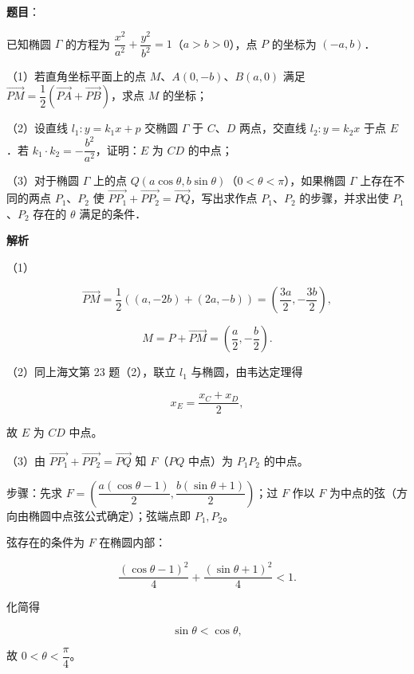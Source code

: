 \begin{answer}

\textbf{题目}：

已知椭圆 $\Gamma$ 的方程为 $\dfrac{x^2}{a^2}+\dfrac{y^2}{b^2}=1$（$a>b>0$），点 $P$ 的坐标为 $(-a,b)$．

（1）若直角坐标平面上的点 $M$、$A(0,-b)$、$B(a,0)$ 满足 $\overrightarrow{PM}=\dfrac12\left(\overrightarrow{PA}+\overrightarrow{PB}\right)$，求点 $M$ 的坐标；

（2）设直线 $l_1:y=k_1x+p$ 交椭圆 $\Gamma$ 于 $C$、$D$ 两点，交直线 $l_2:y=k_2x$ 于点 $E$．若 $k_1\cdot k_2=-\dfrac{b^2}{a^2}$，证明：$E$ 为 $CD$ 的中点；

（3）对于椭圆 $\Gamma$ 上的点 $Q(a\cos\theta,b\sin\theta)$（$0<\theta<\pi$），如果椭圆 $\Gamma$ 上存在不同的两点 $P_1$、$P_2$ 使 $\overrightarrow{PP_1}+\overrightarrow{PP_2}=\overrightarrow{PQ}$，写出求作点 $P_1$、$P_2$ 的步骤，并求出使 $P_1$、$P_2$ 存在的 $\theta$ 满足的条件．
\nopagebreak[4]
\begin{center}\end{center}
\nopagebreak[4]
\textbf{解析}

（1）

\nopagebreak[4]
\[\overrightarrow{PM}=\frac12\left((a,-2b)+(2a,-b)\right)
=\left(\frac{3a}2,-\frac{3b}2\right),\]

\nopagebreak[4]
\[M=P+\overrightarrow{PM}
=\left(\frac a2,-\frac b2\right).\]

（2）同上海文第 23 题（2），联立 $l_1$ 与椭圆，由韦达定理得

\nopagebreak[4]
\[x_E=\frac{x_C+x_D}2,\]

故 $E$ 为 $CD$ 中点。

（3）由 $\overrightarrow{PP_1}+\overrightarrow{PP_2}=\overrightarrow{PQ}$ 知 $F$（$PQ$ 中点）为 $P_1P_2$ 的中点。

步骤：先求 $F=\left(\dfrac{a(\cos\theta-1)}2,\dfrac{b(\sin\theta+1)}2\right)$；过 $F$ 作以 $F$ 为中点的弦（方向由椭圆中点弦公式确定）；弦端点即 $P_1,P_2$。

弦存在的条件为 $F$ 在椭圆内部：

\nopagebreak[4]
\[\frac{(\cos\theta-1)^2}4+\frac{(\sin\theta+1)^2}4<1.\]

化简得

\nopagebreak[4]
\[\sin\theta<\cos\theta,\]

故 $0<\theta<\dfrac\pi4$。


\end{answer}